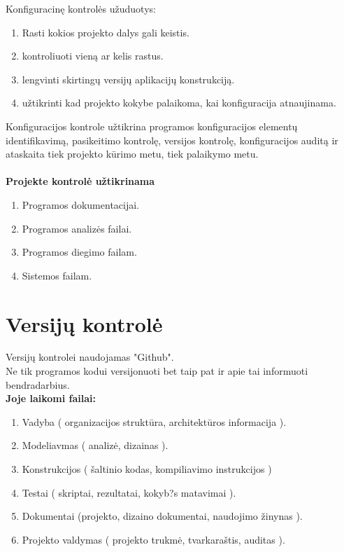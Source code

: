 \documentclass[a4paper,12pt]{article}
\begin{document}
Konfiguracin\k e kontrol\. es u\v zuduotys:
\begin{enumerate}
	\item Rasti kokios projekto dalys gali keistis.
	\item kontroliuoti vien\k a ar kelis rastus.
	\item lengvinti skirting\k u versij\k u aplikacij\k u konstrukcij\k a. 
	\item u\v ztikrinti kad projekto kokybe palaikoma, kai konfiguracija atnaujinama.
\end{enumerate}


Konfiguracijos kontrole u\v ztikrina programos konfiguracijos element\k u identifikavim\k a, pasikeitimo kontrol\k e, versijos kontrol\k e, konfiguracijos audit\k a ir ataskaita tiek projekto k\= urimo metu, tiek palaikymo metu.\\\\


\large\textbf{Projekte kontrol\. e u\v ztikrinama}
\normalsize
\begin{enumerate}
	\item Programos dokumentacijai.
	\item Programos analiz\. es failai.
	\item Programos diegimo failam.
	\item Sistemos failam.
\end{enumerate}

\clearpage

\section{Versij\k u kontrol\. e}

Versij\k u kontrolei naudojamas "Github".\\
Ne tik programos kodui versijonuoti bet taip pat ir apie tai informuoti bendradarbius.\\

\large\textbf{Joje laikomi failai:}
\normalsize
\begin{enumerate}

	\item Vadyba ( organizacijos strukt\= ura, architekt\= uros informacija ).
	\item Modeliavmas ( analiz\. e, dizainas ).
	\item Konstrukcijos ( \v saltinio kodas, kompiliavimo instrukcijos )
	\item Testai ( skriptai, rezultatai, kokyb?s matavimai ).
	\item Dokumentai (projekto, dizaino dokumentai, naudojimo \v zinynas ).
	\item Projekto valdymas ( projekto trukm\. e, tvarkara\v stis, auditas ).
		
\end{enumerate}
\clearpage 
\end{document}
